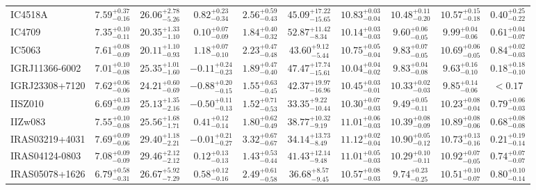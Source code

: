 \documentclass[onecolumn]{mn2e}
\begin{document}
\begin{landscape}
{\begin{center}
\begin{longtable}{lccccccccc}
IC4518A & $7.59_{-0.16}^{+0.37}$ & $26.06_{-5.26}^{+2.78}$ & $0.82_{-0.34}^{+0.23}$ & $2.56_{-0.43}^{+0.59}$ &$45.09_{-15.65}^{+17.22}$ & $10.83_{-0.04}^{+0.03}$ & $10.48_{-0.20}^{+0.11}$ & $10.57_{-0.18}^{+0.15}$ & $0.40_{-0.22}^{+0.25}$ \\
IC4709 & $7.35_{-0.11}^{+0.10}$ & $20.35_{-1.10}^{+1.33}$ & $0.10_{-0.09}^{+0.07}$ & $1.84_{-0.32}^{+0.40}$ &$52.87_{-8.34}^{+11.42}$ & $10.14_{-0.03}^{+0.03}$ & $9.60_{-0.05}^{+0.06}$ & $9.99_{-0.06}^{+0.04}$ & $0.61_{-0.07}^{+0.04}$ \\
IC5063 & $7.61_{-0.09}^{+0.08}$ & $20.11_{-0.93}^{+1.10}$ & $1.18_{-0.10}^{+0.07}$ & $2.23_{-0.48}^{+0.47}$ &$43.60_{-5.44}^{+9.12}$ & $10.75_{-0.04}^{+0.05}$ & $9.83_{-0.05}^{+0.07}$ & $10.69_{-0.05}^{+0.06}$ & $0.84_{-0.03}^{+0.02}$ \\
IGRJ11366-6002 & $7.01_{-0.08}^{+0.10}$ & $25.35_{-1.60}^{+1.01}$ & $-0.11_{-0.23}^{+0.24}$ & $1.89_{-0.40}^{+0.47}$ &$47.47_{-15.61}^{+17.74}$ & $10.04_{-0.02}^{+0.04}$ & $9.83_{-0.08}^{+0.04}$ & $9.63_{-0.10}^{+0.16}$ & $0.18_{-0.10}^{+0.18}$ \\
IGRJ23308+7120 & $7.62_{-0.06}^{+0.06}$ & $24.21_{-0.69}^{+0.60}$ & $-0.88_{-0.15}^{+0.20}$ & $1.55_{-0.45}^{+0.63}$ &$42.37_{-16.96}^{+19.97}$ & $10.45_{-0.01}^{+0.03}$ & $10.33_{-0.03}^{+0.02}$ & $9.85_{-0.06}^{+0.14}$ & $<0.17$ \\
IISZ010 & $6.69_{-0.09}^{+0.13}$ & $25.13_{-2.16}^{+1.35}$ & $-0.50_{-0.13}^{+0.11}$ & $1.52_{-0.53}^{+0.71}$ &$33.35_{-10.44}^{+9.22}$ & $10.30_{-0.03}^{+0.07}$ & $9.49_{-0.11}^{+0.05}$ & $10.23_{-0.04}^{+0.08}$ & $0.79_{-0.03}^{+0.06}$ \\
IIZw083 & $7.55_{-0.08}^{+0.10}$ & $25.56_{-1.71}^{+1.68}$ & $0.41_{-0.14}^{+0.12}$ & $1.80_{-0.49}^{+0.62}$ &$38.77_{-9.19}^{+10.32}$ & $11.01_{-0.03}^{+0.06}$ & $10.39_{-0.09}^{+0.08}$ & $10.89_{-0.06}^{+0.08}$ & $0.68_{-0.08}^{+0.08}$ \\
IRAS03219+4031 & $7.69_{-0.06}^{+0.09}$ & $29.40_{-2.21}^{+1.18}$ & $-0.01_{-0.27}^{+0.21}$ & $3.32_{-0.67}^{+0.67}$ &$34.14_{-8.49}^{+13.73}$ & $11.12_{-0.04}^{+0.02}$ & $10.90_{-0.12}^{+0.05}$ & $10.73_{-0.16}^{+0.13}$ & $0.21_{-0.14}^{+0.19}$ \\
IRAS04124-0803 & $7.08_{-0.09}^{+0.09}$ & $29.46_{-2.12}^{+2.12}$ & $0.12_{-0.13}^{+0.13}$ & $1.43_{-0.44}^{+0.53}$ &$41.43_{-9.48}^{+12.14}$ & $11.01_{-0.03}^{+0.05}$ & $10.29_{-0.11}^{+0.10}$ & $10.92_{-0.05}^{+0.07}$ & $0.74_{-0.07}^{+0.07}$ \\
IRAS05078+1626 & $6.79_{-0.31}^{+0.58}$ & $26.67_{-7.29}^{+5.92}$ & $0.58_{-0.16}^{+0.12}$ & $2.49_{-0.58}^{+0.61}$ &$36.68_{-9.45}^{+8.57}$ & $10.57_{-0.03}^{+0.08}$ & $9.74_{-0.25}^{+0.23}$ & $10.51_{-0.07}^{+0.10}$ & $0.80_{-0.14}^{+0.10}$ \\

\end{longtable}
\end{center}}
\end{landscape}
\end{document}
